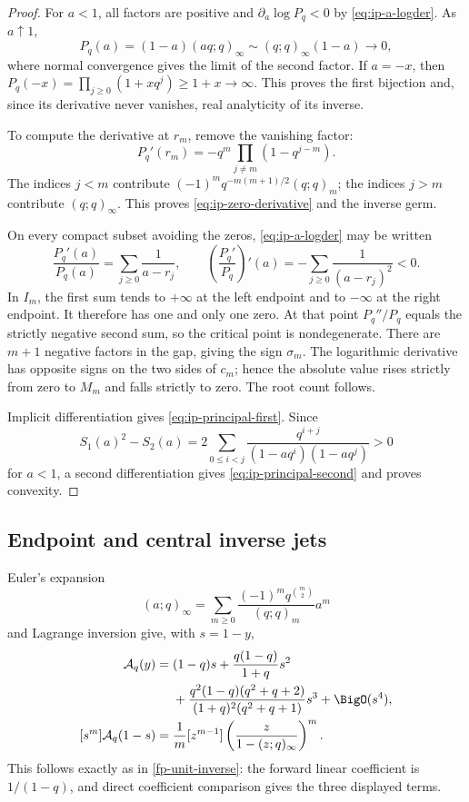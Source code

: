 \begin{proof}
For \(a<1\), all factors are positive and
\(\partial_a\log P_q<0\) by \cref{eq:ip-a-logder}.  As \(a\uparrow1\),
\[
 P_q(a)=(1-a)(aq;q)_\infty
 \sim(q;q)_\infty(1-a)\longrightarrow0,
\]
where normal convergence gives the limit of the second factor.  If \(a=-x\),
then \(P_q(-x)=\prod_{j\geq0}(1+xq^j)\geq1+x\to\infty\).
This proves the first bijection and, since its derivative never vanishes,
real analyticity of its inverse.

To compute the derivative at \(r_m\), remove the vanishing factor:
\[
 P_q'(r_m)=-q^m\prod_{j\ne m}(1-q^{j-m}).
\]
The indices \(j<m\) contribute
\((-1)^mq^{-m(m+1)/2}(q;q)_m\); the indices \(j>m\) contribute
\((q;q)_\infty\).  This proves \cref{eq:ip-zero-derivative} and the inverse
germ.

On every compact subset avoiding the zeros, \cref{eq:ip-a-logder} may be
written
\[
 \frac{P_q'(a)}{P_q(a)}=\sum_{j\geq0}\frac1{a-r_j},\qquad
 \left(\frac{P_q'}{P_q}\right)'(a)
 =-\sum_{j\geq0}\frac1{(a-r_j)^2}<0.
\]
In \(I_m\), the first sum tends to \(+\infty\) at the left endpoint and to
\(-\infty\) at the right endpoint.  It therefore has one and only one zero.
At that point \(P_q''/P_q\) equals the strictly negative second sum, so the
critical point is nondegenerate.  There are \(m+1\) negative factors in the
gap, giving the sign \(\sigma_m\).  The logarithmic derivative has opposite
signs on the two sides of \(c_m\); hence the absolute value rises strictly
from zero to \(M_m\) and falls strictly to zero.  The root count follows.

Implicit differentiation gives \cref{eq:ip-principal-first}.  Since
\[
 S_1(a)^2-S_2(a)
 =2\sum_{0\leq i<j}
 \frac{q^{i+j}}{(1-aq^i)(1-aq^j)}>0
\]
for \(a<1\), a second differentiation gives
\cref{eq:ip-principal-second} and proves convexity.
\end{proof}

\subsection{Endpoint and central inverse jets}

Euler's expansion
\[
 (a;q)_\infty=\sum_{m\geq0}
 \frac{(-1)^mq^{\binom m2}}{(q;q)_m}a^m
\]
and Lagrange inversion give, with \(s=1-y\),
\begin{align}
 \mathcal A_q(y)={}&(1-q)s+\frac{q(1-q)}{1+q}s^2 \notag\\
 &+\frac{q^2(1-q)(q^2+q+2)}
 {(1+q)^2(q^2+q+1)}s^3+\BigO(s^4),
 \label{eq:ip-unit-target-jet}\\
 [s^m]\mathcal A_q(1-s)
 ={}&\frac1m[z^{m-1}]
 \left(\frac{z}{1-(z;q)_\infty}\right)^m.
 \label{eq:ip-unit-target-all-order}
\end{align}
This follows exactly as in \cref{fp-unit-inverse}: the forward linear
coefficient is \(1/(1-q)\), and direct coefficient comparison gives the three
displayed terms.

